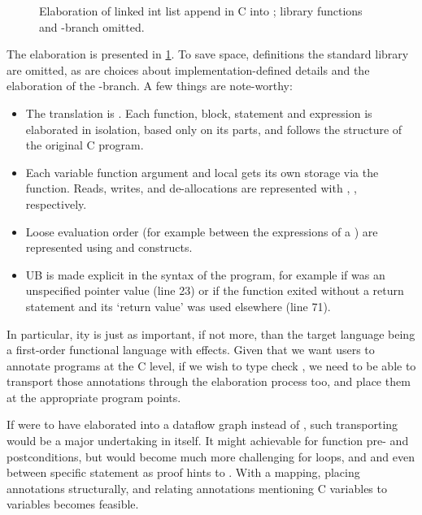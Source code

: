 \begin{figure}[p]
    \centering
    \begin{minipage}{1.2\textwidth}
    \end{minipage}
    \caption{Elaboration of linked int list append in C into
         ; library functions and -branch
        omitted.}\label{fig:append-core}
\end{figure}%

The elaboration is presented in \cref{fig:append-core}. To save space,
definitions the  standard library are omitted, as are choices about
implementation-defined details and the elaboration of the
-branch. A few things are note-worthy:
\begin{itemize}
    \item The translation is . Each function, block,
        statement and expression is elaborated in isolation, based only
        on its parts, and follows the structure of the original C program.
    \item Each variable function argument and local gets its own storage via the
         function. Reads, writes, and de-allocations are
        represented with , ,
         respectively.
    \item Loose evaluation order (for example between the expressions of a \cinline{==})
        are represented using  and  constructs.
    \item UB is made explicit in the syntax of the program, for example if  was
        an unspecified pointer value (line 23) or if the function exited without a return statement
        and its `return value' was used elsewhere (line 71).
\end{itemize}

In particular, ity is just as important, if not more, than the
target language being a first-order functional language with effects. Given
that we want users to annotate programs at the C level, if we wish to type
check , we need to be able to transport those annotations through the
elaboration process too, and place them at the appropriate program points.

If  were to have elaborated into a dataflow graph instead of ,
such transporting would be a major undertaking in itself. It might achievable
for function pre- and postconditions, but would become much more challenging
for loops, and  and even between specific statement as proof
hints to . With a  mapping, placing annotations
structurally, and relating annotations mentioning C variables to 
variables becomes feasible.

